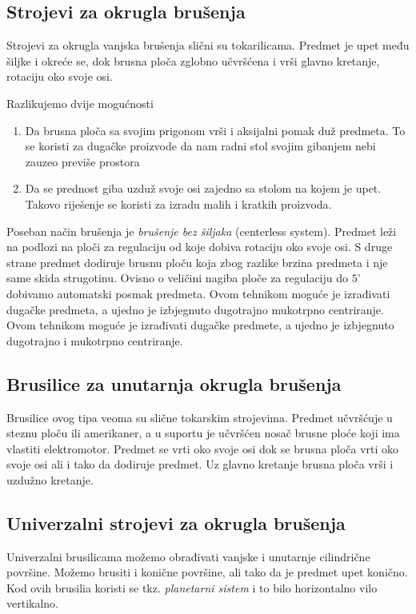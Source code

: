 \documentclass[a4paper,12pt]{article}
\numberwithin{figure}{section}
\begin{document}
\subsection{Strojevi za okrugla brušenja}
Strojevi za okrugla vanjska brušenja slični su tokarilicama. Predmet je upet među šiljke i okreće se, dok brusna ploča zglobno učvršćena i vrši glavno kretanje, rotaciju oko svoje osi. \par
Razlikujemo dvije mogućnosti
\begin{enumerate}
\item Da brusna ploča sa svojim prigonom vrši i aksijalni pomak duž predmeta. To se koristi za dugačke proizvode da nam radni stol svojim gibanjem nebi zauzeo previše prostora
\item Da se prednost giba uzduž svoje osi zajedno sa stolom na kojem je upet. Takovo riješenje se koristi za izradu malih i kratkih proizvoda.
\end{enumerate}
Poseban način brušenja je \textit{brušenje bez šiljaka} (centerless system). Predmet leži na podlozi na ploči za regulaciju od koje dobiva rotaciju oko svoje osi. S druge strane predmet dodiruje brusnu ploču koja zbog razlike brzina predmeta i nje same skida strugotinu. Ovisno o veličini nagiba ploče za regulaciju do $5^{\circ}$ dobivamo automatski posmak predmeta. Ovom tehnikom moguće je izrađivati dugačke predmeta, a ujedno je izbjegnuto dugotrajno mukotrpno centriranje. Ovom tehnikom moguće je izrađivati dugačke predmete, a ujedno je izbjegnuto dugotrajno i mukotrpno centriranje. 
\subsection{Brusilice za unutarnja okrugla brušenja}
Brusilice ovog tipa veoma su slične tokarskim strojevima. Predmet učvršćuje u steznu ploču ili amerikaner, a u suportu je učvršćen nosač brusne ploće koji ima vlastiti elektromotor. Predmet se vrti oko svoje osi dok se brusna ploča vrti oko svoje osi ali i tako da dodiruje predmet. Uz glavno kretanje brusna ploča vrši i uzdužno kretanje.
\subsection{Univerzalni strojevi za okrugla brušenja}
Univerzalni brusilicama možemo obrađivati vanjske i unutarnje cilindrične površine. Možemo brusiti i konične površine, ali tako da je predmet upet konično. Kod ovih brusilia koristi se tkz. \textit{planetarni sistem} i to bilo horizontalno vilo vertikalno.
\end{document}
